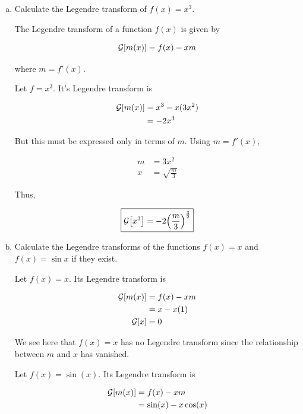 \documentclass[9pt,a4paper,twocolumn]{article}
\begin{document}
\begin{enumerate}[(a)]

\item Calculate the Legendre transform of $f(x) = x^3$.

The Legendre transform of a function $f(x)$ is given by

\begin{equation}\label{eq:legendre-def}
	\mathcal{G}\qty[m(x)] = f(x) - xm
\end{equation}

where $m = f'(x)$.

Let $f = x^3$. It's Legendre transform is

\begin{align}
	\mathcal{G}\qty[m(x)] &= x^3 - x(3x^2) \nonumber \\
	&= -2x^3
\end{align}

But this must be expressed only in terms of $m$. Using $m = f'(x)$,

\begin{align}
	m &= 3x^2 \nonumber \\
	x &= \sqrt{\frac{m}{3}}
\end{align}

Thus,

\begin{equation}\label{eq:answer-a}
	\boxed{
		\mathcal{G}\qty[x^3] = -2\qty(\frac{m}{3})^{\frac{3}{2}}
	}
\end{equation}

\item Calculate the Legendre transforms of the functions $f(x) = x$ and $f(x) = \sin{x}$ if they exist.

Let $f(x) = x$. Its Legendre transform is

\begin{align}
	\mathcal{G}\qty[m(x)] &= f(x) - xm \nonumber \\
	&= x - x(1) \nonumber \\
	\mathcal{G}\qty[x] &= 0 \label{eq:answer-b1}
\end{align}

We see here that $f(x) = x$ has no Legendre transform since the relationship between $m$ and $x$ has vanished.

Let $f(x) = \sin(x)$. Its Legendre transform is

\begin{align}
	\mathcal{G}\qty[m(x)] &= f(x) - xm \nonumber \\
	&= \sin(x) - x\cos(x) \\
\end{align}


\end{enumerate}
\end{document}
